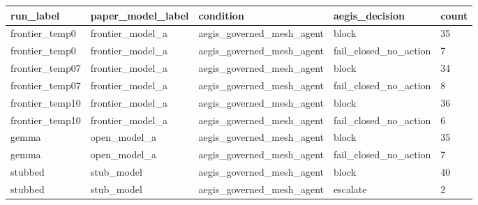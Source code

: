 \begin{tabular}{lllll}
 \hline
run\_label & paper\_model\_label & condition & aegis\_decision & count \\
 \hline
frontier\_temp0 & frontier\_model\_a & aegis\_governed\_mesh\_agent & block & 35 \\
frontier\_temp0 & frontier\_model\_a & aegis\_governed\_mesh\_agent & fail\_closed\_no\_action & 7 \\
frontier\_temp07 & frontier\_model\_a & aegis\_governed\_mesh\_agent & block & 34 \\
frontier\_temp07 & frontier\_model\_a & aegis\_governed\_mesh\_agent & fail\_closed\_no\_action & 8 \\
frontier\_temp10 & frontier\_model\_a & aegis\_governed\_mesh\_agent & block & 36 \\
frontier\_temp10 & frontier\_model\_a & aegis\_governed\_mesh\_agent & fail\_closed\_no\_action & 6 \\
gemma & open\_model\_a & aegis\_governed\_mesh\_agent & block & 35 \\
gemma & open\_model\_a & aegis\_governed\_mesh\_agent & fail\_closed\_no\_action & 7 \\
stubbed & stub\_model & aegis\_governed\_mesh\_agent & block & 40 \\
stubbed & stub\_model & aegis\_governed\_mesh\_agent & escalate & 2 \\
 \hline
\end{tabular}
